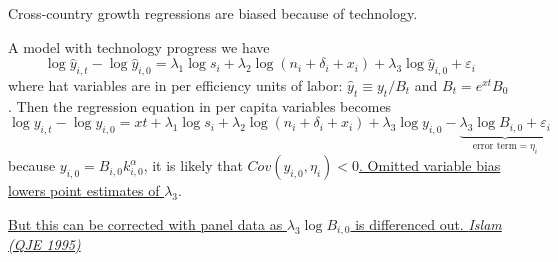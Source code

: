 Cross-country growth regressions are biased because of technology.

A model with technology progress we have \[
    \log \hat{y}_{i,t} - \log\hat{y}_{i,0} = \lambda_1 \log s_i + \lambda_2 \log(n_i + \delta_i + x_i) + \lambda_3 \log\hat{y}_{i,0} + \varepsilon_i
\] where hat variables are in per efficiency units of labor: $\hat{y}_t \equiv y_t/B_t$ and $B_t = e^{xt}B_0$.
Then the regression equation in per capita variables becomes \[
    \log y_{i,t} - \log y_{i,0} = xt + \lambda_1\log s_i + \lambda_2\log(n_i+\delta_i+x_i) + \lambda_3\log y_{i,0} - \underbrace{\lambda_3 \log B_{i,0} + \varepsilon_i}_{\text{error term} = \eta_i}
\] because $y_{i,0} = B_{i,0}k_{i,0}^{\alpha}$, it is likely that \underline{$Cov(y_{i,0},\eta_i)<0$. Omitted variable bias lowers point estimates of $\lambda_3$}.

\underline{But this can be corrected with panel data as $\lambda_3 \log B_{i,0}$ is differenced out. \textit{Islam (QJE 1995)}
}
